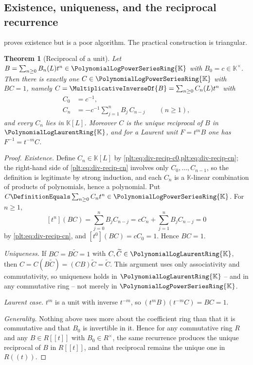\documentclass[11pt,oneside]{article}
\theoremstyle{plain}
\newtheorem{theorem}{Theorem}[section]
\theoremstyle{definition}
\theoremstyle{remark}
\newcommand{\K}{\mathbb{K}}
\newcommand{\PLpow}{\PolynomialLogPowerSeriesRing{\K}}   %
\newcommand{\PLlau}{\PolynomialLogLaurentRing{\K}}       %
\newcommand{\recip}[1]{\MultiplicativeInverseOf{#1}}
\begin{document}
\subsection{Existence, uniqueness, and the reciprocal recurrence}
\label{plt:sec:div-recurrence}

 proves existence but is a poor algorithm.  The
practical construction is triangular.

\begin{theorem}[Reciprocal of a unit]\label{plt:thm:div-reciprocal}
Let \(B=\sum_{n\ge0}B_{n}(L)t^{n}\in\PLpow\) with \(B_{0}=c\in\K^{\times}\).
Then there is exactly one \(C\in\PLpow\) with \(BC=1\), namely
\(C=\recip{B}=\sum_{n\ge0}C_{n}(L)t^{n}\) with
\begin{align}
  C_{0}&=c^{-1},\label{plt:eq:div-recip-c0}\\
  C_{n}&=-c^{-1}\sum_{j=1}^{n}B_{j}\,C_{n-j}\qquad(n\ge1),
        \label{plt:eq:div-recip-cn}
\end{align}
and every \(C_{n}\) lies in \(\K[L]\).  Moreover \(C\) is the unique reciprocal
of \(B\) in \(\PLlau\), and for a Laurent unit \(F=t^{m}B\) one has
\(F^{-1}=t^{-m}C\).
\end{theorem}

\begin{proof}
\emph{Existence.}  Define \(C_{n}\in\K[L]\) by
\cref{plt:eq:div-recip-c0,plt:eq:div-recip-cn}; the right-hand side of
\cref{plt:eq:div-recip-cn} involves only \(C_{0},\dots,C_{n-1}\), so the
definition is legitimate by strong induction, and each \(C_{n}\) is a
\(\K\)-linear combination of products of polynomials, hence a polynomial.  Put
\(C\DefinitionEquals\sum_{n\ge0}C_{n}t^{n}\in\PLpow\).  For \(n\ge1\),
\[
  [t^{n}](BC)=\sum_{j=0}^{n}B_{j}C_{n-j}
  =cC_{n}+\sum_{j=1}^{n}B_{j}C_{n-j}=0
\]
by \cref{plt:eq:div-recip-cn}, and \([t^{0}](BC)=cC_{0}=1\).  Hence \(BC=1\).

\emph{Uniqueness.}  If \(BC=B\widetilde C=1\) with
\(C,\widetilde C\in\PLlau\), then
\(C=C(B\widetilde C)=(CB)\widetilde C=\widetilde C\).  This argument uses only
associativity and commutativity, so uniqueness holds in \(\PLlau\) -- and in
any commutative ring -- not merely in \(\PLpow\).

\emph{Laurent case.}  \(t^{m}\) is a unit with inverse \(t^{-m}\), so
\((t^{m}B)(t^{-m}C)=BC=1\).

\emph{Generality.}  Nothing above uses more about the coefficient ring than
that it is commutative and that \(B_{0}\) is invertible in it.  Hence for any
commutative ring \(R\) and any \(B\in R[[t]]\) with \(B_{0}\in R^{\times}\),
the same recurrence produces the unique reciprocal of \(B\) in \(R[[t]]\), and
that reciprocal remains the unique one in \(R((t))\).
\end{proof}
\end{document}
